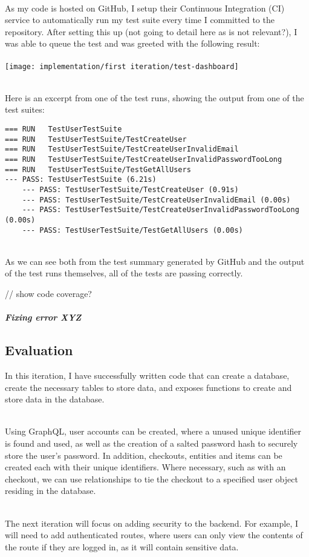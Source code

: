 \documentclass[../../main.tex]{subfiles}
\begin{document}
\noindent \\ As my code is hosted on GitHub, I setup their Continuous Integration (CI) service to automatically run my test suite every time I committed to the repository. After setting this up (not going to detail here as is not relevant?), I was able to queue the test and was greeted with the following result: \\\\

\texttt{[image: implementation/first iteration/test-dashboard]}

\noindent \\ Here is an excerpt from one of the test runs, showing the output from one of the test suites:

\begin{lstlisting}
=== RUN   TestUserTestSuite
=== RUN   TestUserTestSuite/TestCreateUser
=== RUN   TestUserTestSuite/TestCreateUserInvalidEmail
=== RUN   TestUserTestSuite/TestCreateUserInvalidPasswordTooLong
=== RUN   TestUserTestSuite/TestGetAllUsers
--- PASS: TestUserTestSuite (6.21s)
    --- PASS: TestUserTestSuite/TestCreateUser (0.91s)
    --- PASS: TestUserTestSuite/TestCreateUserInvalidEmail (0.00s)
    --- PASS: TestUserTestSuite/TestCreateUserInvalidPasswordTooLong (0.00s)
    --- PASS: TestUserTestSuite/TestGetAllUsers (0.00s)
\end{lstlisting}

\noindent \\ As we can see both from the test summary generated by GitHub and the output of the test runs themselves, all of the tests are passing correctly.

// show code coverage?

\subparagraph{Fixing error XYZ}

\subsection{Evaluation}

\noindent In this iteration, I have successfully written code that can create a database, create the necessary tables to store data, and exposes functions to create and store data in the database.

\noindent \\ Using GraphQL, user accounts can be created, where a unused unique identifier is found and used, as well as the creation of a salted password hash to securely store the user's password. In addition, checkouts, entities and items can be created each with their unique identifiers. Where necessary, such as with an checkout, we can use relationships to tie the checkout to a specified user object residing in the database.

\noindent \\ The next iteration will focus on adding security to the backend. For example, I will need to add authenticated routes, where users can only view the contents of the route if they are logged in, as it will contain sensitive data.
\end{document}
